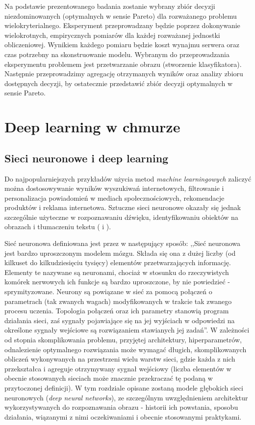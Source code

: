 \documentclass[12pt,a4paper,twoside]{article}
\begin{document}
Na podstawie prezentowanego badania zostanie wybrany zbiór decyzji niezdominowanych (optymalnych w sensie Pareto) dla rozważanego problemu wielokryterialnego. Eksperyment przeprowadzany będzie poprzez dokonywanie wielokrotnych, empirycznych pomiarów dla każdej rozważanej jednostki obliczeniowej. Wynikiem każdego pomiaru będzie koszt wynajmu serwera oraz czas potrzebny na skonstruowanie modelu. Wybranym do przeprowadzania eksperymentu problemem jest przetwarzanie obrazu (stworzenie klasyfikatora). Następnie przeprowadzimy agregację otrzymanych wyników oraz analizy zbioru dostępnych decyzji, by ostatecznie przedstawić zbiór decyzji optymalnych w sensie Pareto.

\clearpage


\section{Deep learning w chmurze}
\subsection{Sieci neuronowe i deep learning}

Do najpopularniejszych przykładów użycia metod \textit{machine learningowych} zaliczyć można dostosowywanie wyników wyszukiwań internetowych, filtrowanie i personalizacja powiadomień w mediach społecznościowych, rekomendacje produktów i reklama internetowa. Sztuczne sieci neuronowe okazały się jednak szczególnie użyteczne w rozpoznawaniu dźwięku, identyfikowaniu obiektów na obrazach i tłumaczeniu tekstu (\citet{schmidhuber2015} i \citet{goodfellow2016}).

Sieć neuronowa definiowana jest przez \citet{tadeusiewicz1993} w następujący sposób: ,,Sieć neuronowa jest bardzo uproszczonym modelem mózgu. Składa się ona z dużej liczby (od kilkuset do kilkudziesięciu tysięcy) elementów przetwarzających informację. Elementy te nazywane są neuronami, chociaż w stosunku do rzeczywistych komórek nerwowych ich funkcje są bardzo uproszczone, by nie powiedzieć - sprymityzowane. Neurony są powiązane w sieć za pomocą połączeń o parametrach (tak zwanych wagach) modyfikowanych w trakcie tak zwanego procesu uczenia. Topologia połączeń oraz ich parametry stanowią program działania sieci, zaś sygnały pojawiające się na jej wyjściach w odpowiedzi na określone sygnały wejściowe są rozwiązaniem stawianych jej zadań''.
W zależności od stopnia skomplikowania problemu, przyjętej architektury, hiperparametrów, odnalezienie optymalnego rozwiązania może wymagać długich, skomplikowanych obliczeń wykonywanych na przestrzeni wielu warstw sieci, gdzie każda z nich przekształca i agreguje otrzymywany sygnał wejściowy (liczba elementów w obecnie stosowanych sieciach może znacznie przekraczać tę podaną w przytoczonej definicji). W tym rozdziale opisane zostaną modele głębokich sieci neuronowych (\textit{deep neural networks}), ze szczególnym uwzględnieniem architektur wykorzystywanych do rozpoznawania obrazu - historii ich powstania, sposobu działania, wiązanymi z nimi oczekiwaniami i obecnie stosowanymi praktykami.
\end{document}
